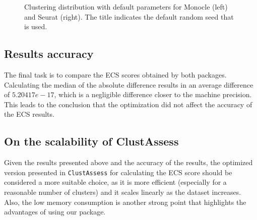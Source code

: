 \begin{figure}[H]
    \centering
    \caption{\label{fig:comp-k}Clustering distribution with default parameters for Monocle (left) and Seurat (right). The title indicates the default random seed that is used.}
\end{figure}

\subsection{Results accuracy}
The final task is to compare the ECS scores obtained by both packages. Calculating the median of the absolute difference results in an average difference of $5.20417e-17$, which is a negligible difference closer to the machine precision. This leads to the conclusion that the optimization did not affect the accuracy of the ECS results.

\subsection{On the scalability of ClustAssess}
Given the results presented above and the accuracy of the results, the optimized version presented in \verb|ClustAssess| for calculating the ECS score should be considered a more suitable choice, as it is more efficient (especially for a reasonable number of clusters) and it scales linearly as the dataset increases. Also, the low memory consumption is another strong point that highlights the advantages of using our package.


